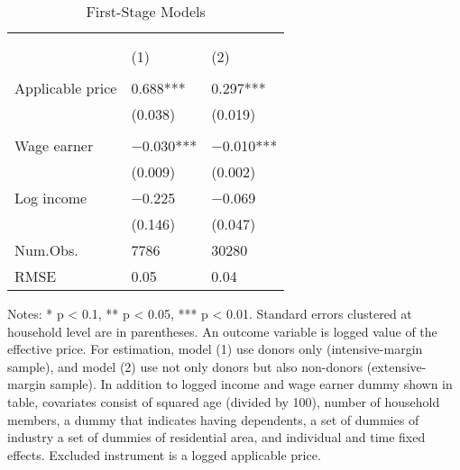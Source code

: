 \begin{table}

\caption{First-Stage Models\label{tab:main-stage1}}
\centering
\fontsize{8}{10}\selectfont
\begin{threeparttable}
\begin{tabular}[t]{l>{\centering\arraybackslash}p{18.75em}>{\centering\arraybackslash}p{18.75em}}
\toprule
\multicolumn{1}{c}{ } & \multicolumn{2}{c}{Effective price} \\
\cmidrule(l{3pt}r{3pt}){2-3}
\multicolumn{1}{c}{ } & \multicolumn{1}{c}{Donors (Intensive-margin)} & \multicolumn{1}{c}{Donors and Non-donors (Extensive-margin)} \\
\cmidrule(l{3pt}r{3pt}){2-2} \cmidrule(l{3pt}r{3pt}){3-3}
  & (1) & (2)\\
\midrule
\addlinespace[0.3em]
\multicolumn{3}{l}{\textit{Excluded instruments}}\\
\hspace{1em}Applicable price & \num{0.688}*** & \num{0.297}***\\
\hspace{1em} & (\num{0.038}) & (\num{0.019})\\
\addlinespace[0.3em]
\multicolumn{3}{l}{\textit{Covariates}}\\
\hspace{1em}Wage earner & \num{-0.030}*** & \num{-0.010}***\\
\hspace{1em} & (\num{0.009}) & (\num{0.002})\\
\hspace{1em}Log income & \num{-0.225} & \num{-0.069}\\
\hspace{1em} & (\num{0.146}) & (\num{0.047})\\
\midrule
Num.Obs. & \num{7786} & \num{30280}\\
RMSE & \num{0.05} & \num{0.04}\\
\bottomrule
\end{tabular}
\begin{tablenotes}
\item Notes: * p < 0.1, ** p < 0.05, *** p < 0.01. Standard errors clustered at household level are in parentheses. An outcome variable is logged value of the effective price. For estimation, model (1) use donors only (intensive-margin sample), and model (2) use not only donors but also non-donors (extensive-margin sample). In addition to logged income and wage earner dummy shown in table, covariates consist of squared age (divided by 100), number of household members, a dummy that indicates having dependents, a set of dummies of industry a set of dummies of residential area, and individual and time fixed effects. Excluded instrument is a logged applicable price.
\end{tablenotes}
\end{threeparttable}
\end{table}
